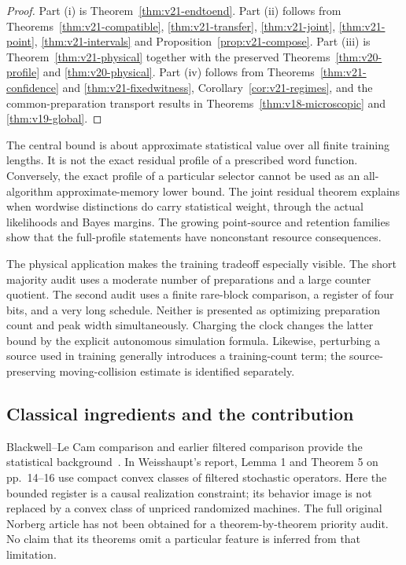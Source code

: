 \begin{proof}
Part (i) is Theorem~\ref{thm:v21-endtoend}. Part (ii) follows from
Theorems~\ref{thm:v21-compatible}, \ref{thm:v21-transfer},
\ref{thm:v21-joint}, \ref{thm:v21-point}, \ref{thm:v21-intervals} and
Proposition~\ref{prop:v21-compose}. Part (iii) is
Theorem~\ref{thm:v21-physical} together with the preserved
Theorems~\ref{thm:v20-profile} and \ref{thm:v20-physical}. Part (iv)
follows from Theorems~\ref{thm:v21-confidence} and
\ref{thm:v21-fixedwitness}, Corollary~\ref{cor:v21-regimes}, and the
common-preparation transport results in
Theorems~\ref{thm:v18-microscopic} and \ref{thm:v19-global}.
\end{proof}

The central bound is about approximate statistical value over all finite
training lengths. It is not the exact residual profile of a prescribed
word function. Conversely, the exact profile of a particular selector
cannot be used as an all-algorithm approximate-memory lower bound. The
joint residual theorem explains when wordwise distinctions do carry
statistical weight, through the actual likelihoods and Bayes margins.
The growing point-source and retention families show that the
full-profile statements have nonconstant resource consequences.

The physical application makes the training tradeoff especially visible.
The short majority audit uses a moderate number of preparations and a
large counter quotient. The second audit uses a finite rare-block
comparison, a register of four bits, and a very long schedule. Neither
is presented as optimizing preparation count and peak width
simultaneously. Charging the clock changes the latter bound by the
explicit autonomous simulation formula. Likewise, perturbing a source
used in training generally introduces a training-count term; the
source-preserving moving-collision estimate is identified separately.

\subsection{Classical ingredients and the contribution}
Blackwell--Le Cam comparison and earlier filtered comparison provide the
statistical background~\cite{Blackwell1953,LeCam1964,Torgersen1991,
Norberg2002,Weisshaupt2002}. In Weisshaupt's report, Lemma 1 and
Theorem 5 on pp.~14--16 use compact convex classes of filtered
stochastic operators. Here the bounded register is a causal realization
constraint; its behavior image is not replaced by a convex class of
unpriced randomized machines. The full original Norberg article has not
been obtained for a theorem-by-theorem priority audit. No claim that its
theorems omit a particular feature is inferred from that limitation.


